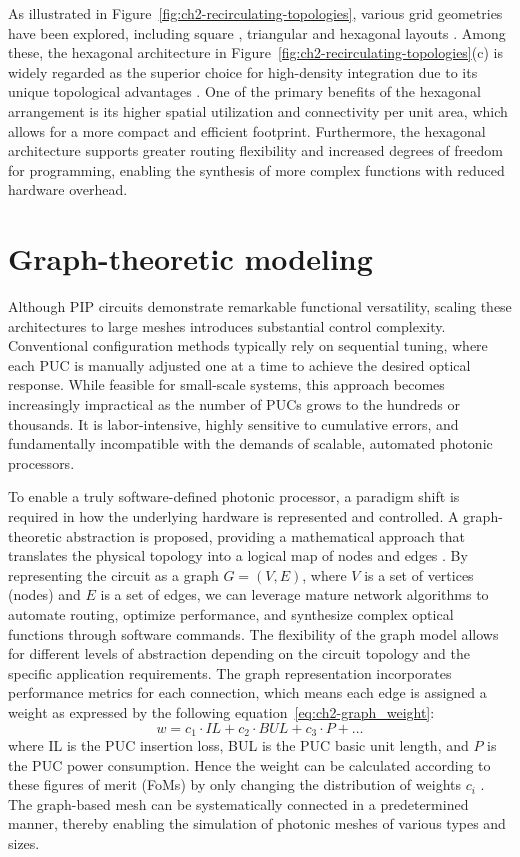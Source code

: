 As illustrated in Figure~\ref{fig:ch2-recirculating-topologies}, various grid geometries have been explored, including square \cite{perez2019integrated}, triangular and hexagonal layouts \cite{perez2017multipurpose}.
Among these, the hexagonal architecture in Figure~\ref{fig:ch2-recirculating-topologies}(c) is widely regarded as the superior choice for high-density integration due to its unique topological advantages \cite{bogaerts2020programmable}.
One of the primary benefits of the hexagonal arrangement is its higher spatial utilization and connectivity per unit area, which allows for a more compact and efficient footprint.
Furthermore, the hexagonal architecture supports greater routing flexibility and increased degrees of freedom for programming, enabling the synthesis of more complex functions with reduced hardware overhead.

\section{Graph-theoretic modeling}\label{sec:graph}
Although PIP circuits demonstrate remarkable functional versatility, scaling these architectures to large meshes introduces substantial control complexity.
Conventional configuration methods typically rely on sequential tuning, where each PUC is manually adjusted one at a time to achieve the desired optical response.
While feasible for small-scale systems, this approach becomes increasingly impractical as the number of PUCs grows to the hundreds or thousands.
It is labor-intensive, highly sensitive to cumulative errors, and fundamentally incompatible with the demands of scalable, automated photonic processors.

To enable a truly software-defined photonic processor, a paradigm shift is required in how the underlying hardware is represented and controlled.
A graph-theoretic abstraction is proposed, providing a mathematical approach that translates the physical topology into a logical map of nodes and edges \cite{bondy2008graph}.
By representing the circuit as a graph $G=(V,E)$, where $V$ is a set of vertices (nodes) and $E$ is a set of edges, we can leverage mature network algorithms to automate routing, optimize performance, and synthesize complex optical functions through software commands.
The flexibility of the graph model allows for different levels of abstraction depending on the circuit topology and the specific application requirements.
The graph representation incorporates performance metrics for each connection, which means each edge is assigned a weight as expressed by the following equation~\eqref{eq:ch2-graph_weight}:
\begin{equation}
    w = c_1 \cdot \textit{IL} + c_2 \cdot \textit{BUL} + c_3 \cdot P + \dots
    \label{eq:ch2-graph_weight}
\end{equation}
where IL is the PUC insertion loss, BUL is the PUC basic unit length, and $P$ is the PUC power consumption.
Hence the weight can be calculated according to these figures of merit (FoMs) by only changing the distribution of weights {$c_i$} \cite{lopez2020auto}.
The graph-based mesh can be systematically connected in a predetermined manner, thereby enabling the simulation of photonic meshes of various types and sizes.

